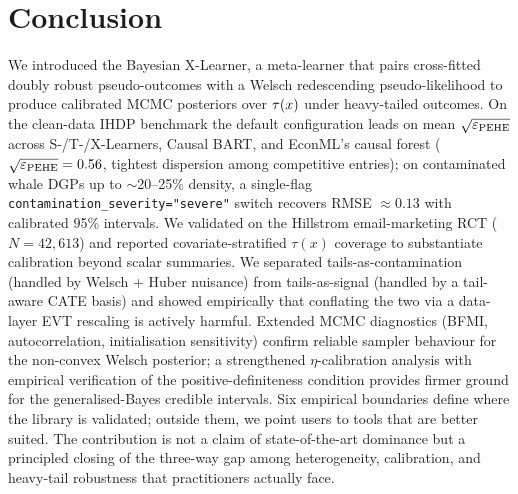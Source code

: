 \section{Conclusion}
\label{sec:conclusion}

We introduced the Bayesian X-Learner, a meta-learner that pairs
cross-fitted doubly robust pseudo-outcomes with a Welsch redescending
pseudo-likelihood to produce calibrated MCMC posteriors over $\tau(x)$
under heavy-tailed outcomes. On the clean-data IHDP benchmark the
default configuration leads on mean $\sqrt{\varepsilon_{\mathrm{PEHE}}}$ across S-/T-/X-Learners,
Causal BART, and EconML's causal forest ($\sqrt{\varepsilon_{\mathrm{PEHE}}} = 0.56$, tightest
dispersion among competitive entries); on contaminated whale DGPs up to
$\sim$20--25\% density, a single-flag
\texttt{contamination\_severity="severe"} switch recovers RMSE
$\approx 0.13$ with calibrated 95\% intervals. We validated on the
Hillstrom email-marketing RCT ($N = 42{,}613$) and reported
covariate-stratified $\tau(x)$ coverage to substantiate calibration
beyond scalar summaries. We separated
tails-as-contamination (handled by Welsch + Huber nuisance) from
tails-as-signal (handled by a tail-aware CATE basis) and showed
empirically that conflating the two via a data-layer EVT rescaling
is actively harmful. Extended MCMC diagnostics (BFMI,
autocorrelation, initialisation sensitivity) confirm reliable
sampler behaviour for the non-convex Welsch posterior; a
strengthened $\eta$-calibration analysis with empirical verification
of the positive-definiteness condition provides firmer ground for
the generalised-Bayes credible intervals. Six empirical
boundaries define where the library is validated; outside them, we
point users to tools that are better suited. The contribution is
not a claim of state-of-the-art dominance but a principled closing
of the three-way gap among heterogeneity, calibration, and
heavy-tail robustness that practitioners actually face.

